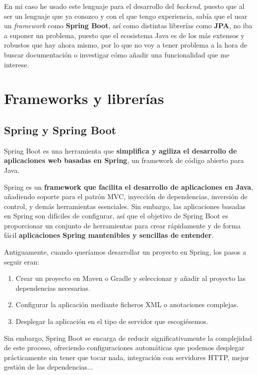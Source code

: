  En mi caso he usado este lenguaje para el desarrollo del \textit{backend}, puesto que al ser un lenguaje que ya conozco y con el que tengo experiencia, sabía 	que el usar un \textit{framework} como \textbf{Spring Boot}, así como distintas librerías como \textbf{JPA}, no iba a suponer un problema, puesto que el ecosistema Java es de los más extensos y robustos que hay ahora mismo, por lo que no voy a tener problema a la hora de buscar documentación o investigar cómo añadir una funcionalidad que me interese.

\section{Frameworks y librerías}

\subsection{Spring y Spring Boot}

Spring Boot es una herramienta que \textbf{simplifica y agiliza el desarrollo de aplicaciones web basadas en Spring}, un framework de código abierto para Java.

Spring es un \textbf{framework que facilita el desarrollo de aplicaciones en Java}, añadiendo soporte para el patrón MVC, inyección de dependencias, inversión de control, y demás herramientas esenciales. Sin embargo, las aplicaciones basadas en Spring son difíciles de configurar, así que el objetivo de Spring Boot es proporcionar un conjunto de herramientas para crear rápidamente y de forma fácil \textbf{aplicaciones Spring mantenibles y sencillas de entender}. \cite{spring:spring-boot}

Antiguamente, cuando queríamos desarrollar un proyecto en Spring, los pasos a seguir eran: 

\begin{enumerate}
  \item Crear un proyecto en Maven o Gradle y seleccionar y añadir al proyecto las dependencias necesarias.
  \item Configurar la aplicación mediante ficheros XML o anotaciones complejas.
  \item Desplegar la aplicación en el tipo de servidor que escogiésemos.
\end{enumerate}

Sin embargo, Spring Boot se encarga de reducir significativamente la complejidad de este proceso, ofreciendo configuraciones automáticas que podemos desplegar prácticamente sin tener que tocar nada, integración con servidores HTTP, mejor gestión de las dependencias... \cite{arquitectura-java:spring-boot}


